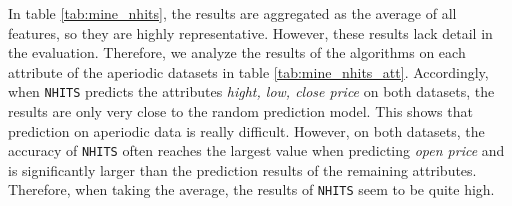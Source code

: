 
In table \ref{tab:mine_nhits}, the results are aggregated as the average of all features, so they are highly representative. However, these results lack detail in the evaluation. Therefore, we analyze the results of the algorithms on each attribute of the aperiodic datasets in table \ref{tab:mine_nhits_att}. Accordingly, when \verb|NHITS| predicts the attributes \textit{hight, low, close price} on both datasets, the results are only very close to the random prediction model. This shows that prediction on aperiodic data is really difficult. However, on both datasets, the accuracy of \verb|NHITS| often reaches the largest value when predicting \textit{open price} and is significantly larger than the prediction results of the remaining attributes. Therefore, when taking the average, the results of \verb|NHITS| seem to be quite high.

